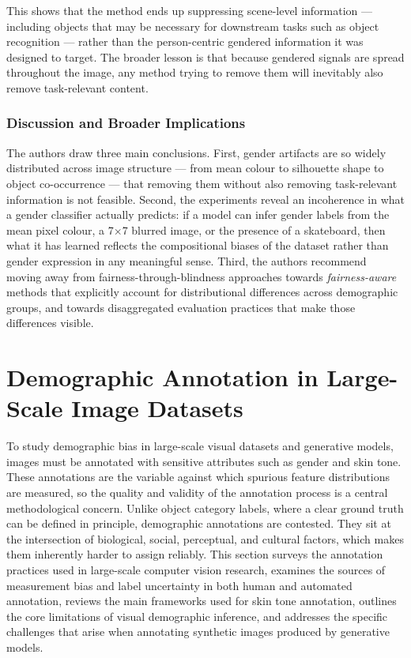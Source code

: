 This shows that the method ends up suppressing scene-level information --- including objects
that may be necessary for downstream tasks such as object recognition --- rather than the
person-centric gendered information it was designed to target.  The broader lesson is that
because gendered signals are spread throughout the image, any method trying to remove them
will inevitably also remove task-relevant content.

\subsubsection*{Discussion and Broader Implications}

The authors draw three main conclusions.  First, gender artifacts are so widely distributed
across image structure --- from mean colour to silhouette shape to object co-occurrence ---
that removing them without also removing task-relevant information is not feasible.  Second,
the experiments reveal an incoherence in what a gender classifier actually predicts: if a
model can infer gender labels from the mean pixel colour, a 7$\times$7 blurred image, or the
presence of a skateboard, then what it has learned reflects the compositional biases of the
dataset rather than gender expression in any meaningful sense.  Third, the authors recommend
moving away from fairness-through-blindness approaches towards \emph{fairness-aware} methods
that explicitly account for distributional differences across demographic groups, and towards
disaggregated evaluation practices that make those differences visible.


\newpage
\section{Demographic Annotation in Large-Scale Image Datasets}

To study demographic bias in large-scale visual datasets and generative models, images must be annotated with sensitive attributes such as gender and skin tone. These annotations are the variable against which spurious feature distributions are measured, so the quality and validity of the annotation process is a central methodological concern. Unlike object category labels, where a clear ground truth can be defined in principle, demographic annotations are contested. They sit at the intersection of biological, social, perceptual, and cultural factors, which makes them inherently harder to assign reliably. This section surveys the annotation practices used in large-scale computer vision research, examines the sources of measurement bias and label uncertainty in both human and automated annotation, reviews the main frameworks used for skin tone annotation, outlines the core limitations of visual demographic inference, and addresses the specific challenges that arise when annotating synthetic images produced by generative models.


